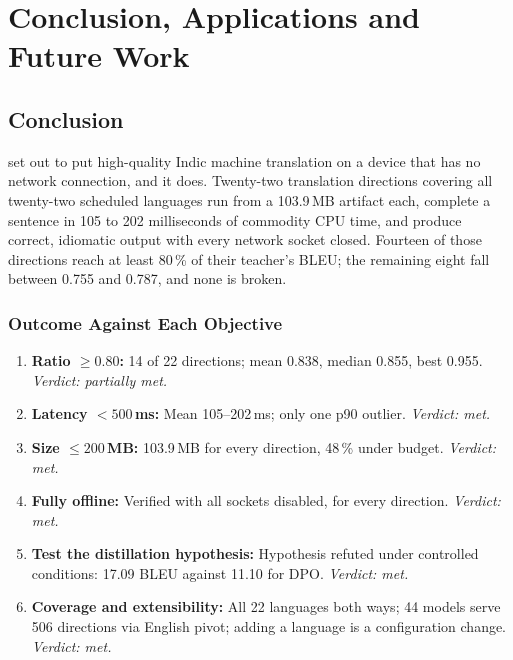 \chapter{Conclusion, Applications and Future Work}
\label{ch:conclusion}

\section{Conclusion}
\label{sec:conclusion}

\setu{} set out to put high-quality Indic machine translation on a device that
has no network connection, and it does. Twenty-two translation directions
covering all twenty-two scheduled languages run from a 103.9\,MB artifact each, complete
a sentence in 105 to 202 milliseconds of commodity CPU time, and produce correct,
idiomatic output with every network socket closed. Fourteen of those directions
reach at least 80\,\% of their teacher's BLEU; the remaining eight fall between
0.755 and 0.787, and none is broken.

\subsection{Outcome Against Each Objective}
\label{subsec:outcomes}

\begin{enumerate}[label=\textbf{\arabic*.}, leftmargin=0.55in]
\item \textbf{Ratio $\geq 0.80$:} 14 of 22 directions; mean 0.838, median 0.855, best 0.955. \emph{Verdict: partially met.}
\item \textbf{Latency $<500$\,ms:} Mean 105--202\,ms; only one p90 outlier. \emph{Verdict: met.}
\item \textbf{Size $\leq 200$\,MB:} 103.9\,MB for every direction, 48\,\% under budget. \emph{Verdict: met.}
\item \textbf{Fully offline:} Verified with all sockets disabled, for every direction. \emph{Verdict: met.}
\item \textbf{Test the distillation hypothesis:} Hypothesis refuted under controlled conditions: \seqkd{} 17.09 BLEU against 11.10 for DPO. \emph{Verdict: met.}
\item \textbf{Coverage and extensibility:} All 22 languages both ways; 44 models serve 506 directions via English pivot; adding a language is a configuration change. \emph{Verdict: met.}
\end{enumerate}

